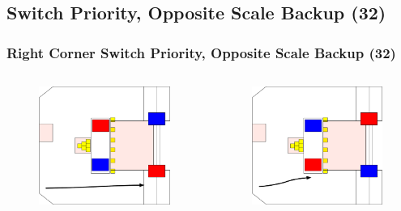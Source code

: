 \documentclass{beamer}
\begin{document}
\subsection{Switch Priority, Opposite Scale Backup (32)}

\begin{frame}
 \frametitle{Right Corner Switch Priority, Opposite Scale Backup \alert{(32)}}
 \begin{columns}
  \begin{figure}
   \includegraphics[scale=0.15]{assets/paths/32_LR}
  \end{figure}
  \begin{figure}
   \includegraphics[scale=0.15]{assets/paths/32_RL}

\end{figure}
\end{columns}
\end{frame}
\end{document}
